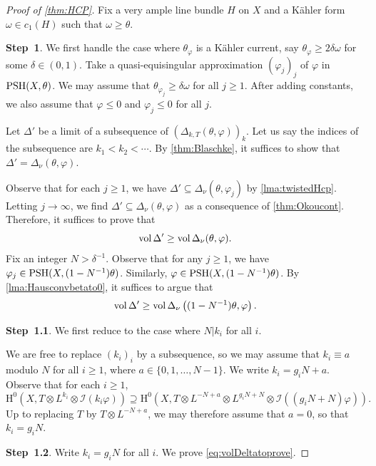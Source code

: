 \begin{proof}[Proof of \cref{thm:HCP}]
Fix a very ample line bundle $H$ on $X$ and a Kähler form $\omega\in c_1(H)$ such that $\omega\geq \theta$.

\textbf{Step~1}. We first handle the case where $\theta_{\varphi}$ is a Kähler current, say $\theta_{\varphi}\geq 2\delta\omega$ for some $\delta\in (0,1)$. Take a quasi-equisingular approximation $(\varphi_j)_j$ of $\varphi$ in $\mathrm{PSH}(X,\theta)$. We may assume that $\theta_{\varphi_j}\geq \delta\omega$ for all $j\geq 1$. After adding constants, we also assume that $\varphi\leq 0$ and $\varphi_j\leq 0$ for all $j$.

Let $\Delta'$ be a limit of a subsequence of $(\Delta_{k,T}(\theta,\varphi))_k$. Let us say the indices of the subsequence are $k_1<k_2<\cdots$. By \cref{thm:Blaschke}, it suffices to show that $\Delta'=\Delta_{\nu}(\theta,\varphi)$.

Observe that for each $j\geq 1$, we have $\Delta'\subseteq \Delta_{\nu}(\theta,\varphi_j)$ by \cref{lma:twistedHcp}. Letting $j\to \infty$, we find $\Delta'\subseteq \Delta_{\nu}(\theta,\varphi)$ as a consequence of \cref{thm:Okoucont}.
Therefore, it suffices to prove that
\[
    \operatorname{vol} \Delta'\geq \operatorname{vol} \Delta_{\nu}(\theta,\varphi).
\]
Fix an integer $N>\delta^{-1}$. Observe that for any $j\geq 1$, we have $\varphi_j\in \mathrm{PSH}(X,(1-N^{-1})\theta)$. Similarly, $\varphi\in \mathrm{PSH}(X,(1-N^{-1})\theta)$.
By \cref{lma:Hausconvbetato0}, it suffices to argue that
\begin{equation}\label{eq:volDeltatoprove}
\operatorname{vol} \Delta'\geq \operatorname{vol} \Delta_{\nu}\left((1-N^{-1})\theta,\varphi\right).
\end{equation}

\textbf{Step~1.1}. We first reduce to the case where $N|k_i$ for all $i$.

We are free to replace $(k_i)_i$ by a subsequence, so we may assume that $k_i\equiv a$ modulo $N$ for all $i\geq 1$, where $a\in \{0,1,\ldots,N-1\}$. We write $k_i=g_i N+a$.
Observe that for each $i\geq 1$,
\[
    \mathrm{H}^0\left(X,T\otimes L^{k_i}\otimes \mathcal{I}(k_i\varphi)\right)\supseteq \mathrm{H}^0\left(X,T\otimes L^{-N+a}\otimes L^{g_i N+ N}\otimes \mathcal{I}\left((g_iN+N)\varphi \right)\right).
\]
Up to replacing $T$ by $T\otimes L^{-N+a}$, we may therefore assume that $a=0$, so that $k_i=g_i N$.

\textbf{Step~1.2}. Write $k_i=g_i N$ for all $i$. We prove \eqref{eq:volDeltatoprove}.


\end{proof}
